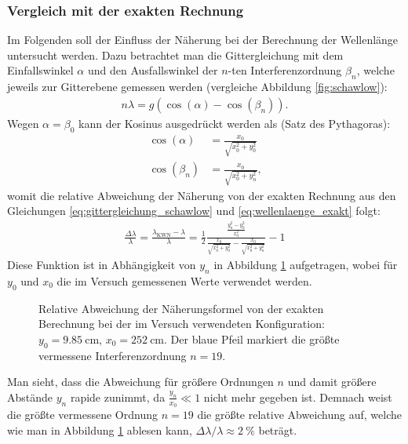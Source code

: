 \documentclass[11pt, a4paper]{article}
\numberwithin{equation}{section}
\begin{document}
\subsubsection{Vergleich mit der exakten Rechnung}
Im Folgenden soll der Einfluss der Näherung bei der Berechnung der Wellenlänge untersucht werden.
Dazu betrachtet man die Gittergleichung mit dem Einfallswinkel $\alpha$ und den Ausfallswinkel der $n$-ten Interferenzordnung $\beta_n$, welche jeweils zur Gitterebene gemessen werden (vergleiche Abbildung \ref{fig:schawlow}):
\begin{align}
	n \lambda = g \left( \cos(\alpha) - \cos(\beta_n) \right) \text{.}
	\label{eq:wellenlaenge_exakt}
\end{align}
Wegen $\alpha = \beta_0$ kann der Kosinus ausgedrückt werden als (Satz des Pythagoras):
\begin{align}
	\cos(\alpha) &= \frac{x_0}{\sqrt{x_0^2 + y_0^2}} \\
	\cos(\beta_n) &= \frac{x_0}{\sqrt{x_0^2 + y_n^2}} \text{,}
\end{align}
womit die relative Abweichung der Näherung von der exakten Rechnung aus den Gleichungen \ref{eq:gittergleichung_schawlow} und \ref{eq:wellenlaenge_exakt} folgt:
\begin{align}
	\frac{\Delta \lambda}{\lambda} = \frac{\lambda_\mathrm{KWN} - \lambda}{\lambda} = \frac{1}{2} \frac{\frac{y_n^2 - y_0^2}{x_0^2}}{ \frac{x_0}{\sqrt{x_0^2 + y_0^2}} - \frac{x_0}{\sqrt{x_0^2 + y_n^2}} } - 1
\end{align}
Diese Funktion ist in Abhängigkeit von $y_n$ in Abbildung \ref{fig:abweichung_wellenlaenge} aufgetragen, wobei für $y_0$ und $x_0$ die im Versuch gemessenen Werte verwendet werden.
\begin{figure}[h]
	\centering
	
	\caption{Relative Abweichung der Näherungsformel von der exakten Berechnung bei der im Versuch verwendeten Konfiguration: $y_0 = \SI{9.85}{\centi\metre}$, $x_0 = \SI{252}{\centi\metre}$. Der blaue Pfeil markiert die größte vermessene Interferenzordnung $n = 19$.}
	\label{fig:abweichung_wellenlaenge}
\end{figure}
Man sieht, dass die Abweichung für größere Ordnungen $n$ und damit größere Abstände $y_n$ rapide zunimmt, da $\frac{y_n}{x_0} \ll 1$ nicht mehr gegeben ist.
Demnach weist die größte vermessene Ordnung $n = \num{19}$ die größte relative Abweichung auf, welche wie man in Abbildung \ref{fig:abweichung_wellenlaenge} ablesen kann, $\Delta \lambda / \lambda \approx \SI{2}{\percent}$ beträgt.
\end{document}
